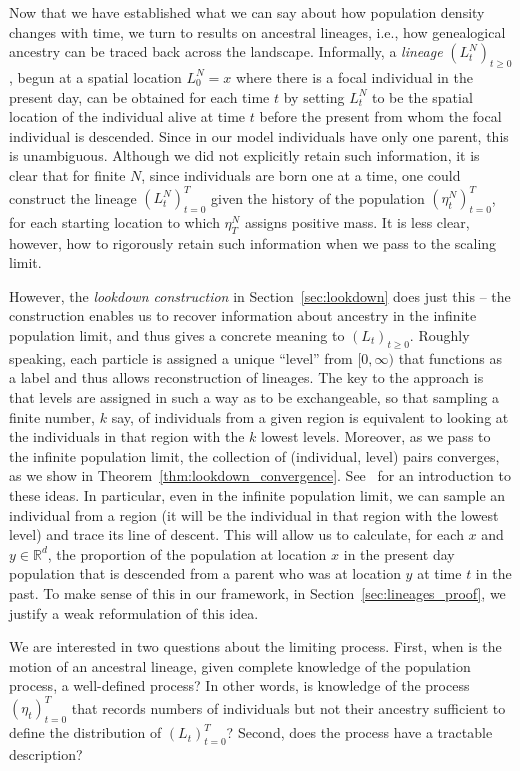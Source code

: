 \documentclass[EJP]{ejpecp} %
\newcommand{\IR}{\mathbb R}
\newcommand{\citet}[1]{\cite{#1}}
\begin{document}
Now that we have established what we can say about how 
population density changes with time,
we turn to results on ancestral lineages,
i.e., how genealogical ancestry can be traced back across the landscape.
Informally,
a \emph{lineage} $(L_t^N)_{t \ge 0}$,
begun at a spatial location $L_0^N = x$
where there is a focal individual in the present day,
can be obtained for each time $t$ by
setting $L_t^N$ to be the spatial location of the individual alive at time $t$
before the present from
whom the focal individual is descended.
Since in our model individuals have only one parent, this is unambiguous.
Although we did not explicitly retain such information,
it is clear that for finite $N$, since individuals are born one at a time, 
one could construct the lineage $(L_t^N)_{t=0}^T$
given the history of the population $(\eta^N_t)_{t = 0}^T$,
for each starting location to which $\eta^N_T$ assigns positive mass.
It is less clear, however, how to rigorously retain such information when we 
pass to the scaling limit.

However, the \emph{lookdown construction} in Section~\ref{sec:lookdown}
does just this -- 
the construction enables us to recover information about ancestry
in the infinite population limit,
and thus gives a concrete meaning to $(L_t)_{t \ge 0}$. 
Roughly speaking,
each particle is assigned a unique ``level'' from $[0,\infty)$
that functions as a label and thus allows reconstruction of lineages.
The key to the approach is that levels are assigned in such a way as to be exchangeable, 
so that sampling a finite number, $k$ say, of
individuals from a given 
region is equivalent to looking at the individuals in that region with the $k$ lowest levels.
Moreover, as we pass to the infinite population limit,
the collection of (individual, level) pairs converges,
as we show in Theorem~\ref{thm:lookdown_convergence}.
See~\citet{etheridge/kurtz:2019} for an introduction to these ideas.
In particular, even in the infinite
population limit, we can sample an individual
from a region (it will be the individual in that region with the lowest level) 
and trace its line of descent. 
This will allow us to calculate, for each $x$ and $y\in\IR^d$, the proportion of
the population at location $x$ in the present day population that is descended from 
a parent who was at location $y$ at time $t$ in the past. To make
sense of this in our framework, in Section~\ref{sec:lineages_proof}, 
we justify a weak reformulation of this idea.

We are interested in two questions about the limiting process.
First, when is the motion of an ancestral 
lineage, given complete knowledge of the population process, a well-defined process?
In other words, is knowledge of the process $(\eta_t)_{t=0}^T$ that records 
numbers of individuals
but not their ancestry sufficient to define the distribution of $(L_t)_{t=0}^T$? 
Second, does the process have a tractable description?
\end{document}
